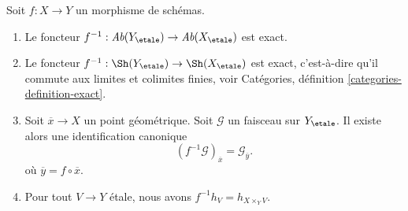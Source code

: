 \begin{lemma}
\label{lemma-stalk-pullback}
Soit $f : X \to Y$ un morphisme de sch\'emas.
\begin{enumerate}
\item Le foncteur
$f^{-1} : \textit{Ab}(Y_\etale) \to \textit{Ab}(X_\etale)$
est exact.
\item Le foncteur
$f^{-1} : \Sh(Y_\etale) \to \Sh(X_\etale)$
est exact, c'est-\`a-dire qu'il commute aux limites et colimites finies, voir
Catégories, définition \ref{categories-definition-exact}.
\item Soit $\overline{x} \to X$ un point g\'eom\'etrique.
Soit $\mathcal{G}$ un faisceau sur $Y_\etale$.
Il existe alors une identification canonique
$$
(f^{-1}\mathcal{G})_{\overline{x}} = \mathcal{G}_{\overline{y}}.
$$
o\`u $\overline{y} = f \circ \overline{x}$.
\item Pour tout $V \to Y$ \'etale, nous avons $f^{-1}h_V = h_{X \times_Y V}$.
\end{enumerate}
\end{lemma}

